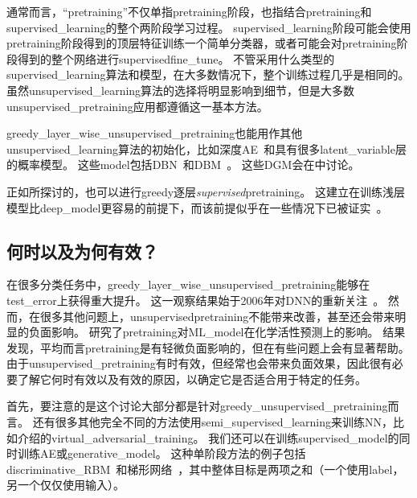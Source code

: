 通常而言，``\gls{pretraining}''不仅单指\gls{pretraining}阶段，也指结合\gls{pretraining}和\gls{supervised_learning}的整个两阶段学习过程。
\gls{supervised_learning}阶段可能会使用\gls{pretraining}阶段得到的顶层特征训练一个简单分类器，或者可能会对\gls{pretraining}阶段得到的整个网络进行\gls{supervised}\gls{fine_tune}。
不管采用什么类型的\gls{supervised_learning}算法和模型，在大多数情况下，整个训练过程几乎是相同的。
虽然\gls{unsupervised_learning}算法的选择将明显影响到细节，但是大多数\gls{unsupervised_pretraining}应用都遵循这一基本方法。


\gls{greedy_layer_wise_unsupervised_pretraining}也能用作其他\gls{unsupervised_learning}算法的初始化，比如深度\gls{AE}~\citep{Hinton-Science2006}和具有很多\gls{latent_variable}层的概率模型。
这些\gls{model}包括\gls{DBN}~\citep{Hinton06-small}和\gls{DBM}~\citep{Salakhutdinov+Hinton-2009-small}。
这些\gls{DGM}会在中讨论。


正如所探讨的，也可以进行\gls{greedy}逐层\emph{\gls{supervised}}\gls{pretraining}。
这建立在训练浅层模型比\gls{deep_model}更容易的前提下，而该前提似乎在一些情况下已被证实~\citep{Erhan+al-2010-small}。

\subsection{何时以及为何有效？}
\label{sec:when_and_why_does_unsupervised_pretraining_work}

在很多分类任务中，\gls{greedy_layer_wise_unsupervised_pretraining}能够在\gls{test_error}上获得重大提升。
这一观察结果始于2006年对\gls{DNN}的重新关注~\citep{Hinton06-small,Bengio-nips-2006,ranzato-07-small}。
然而，在很多其他问题上，\gls{unsupervised}\gls{pretraining}不能带来改善，甚至还会带来明显的负面影响。
\cite{Ma-et-al-2015}研究了\gls{pretraining}对\gls{ML_model}在化学活性预测上的影响。
结果发现，平均而言\gls{pretraining}是有轻微负面影响的，但在有些问题上会有显著帮助。
由于\gls{unsupervised_pretraining}有时有效，但经常也会带来负面效果，因此很有必要了解它何时有效以及有效的原因，以确定它是否适合用于特定的任务。


首先，要注意的是这个讨论大部分都是针对\gls{greedy_unsupervised_pretraining}而言。
还有很多其他完全不同的方法使用\gls{semi_supervised_learning}来训练\gls{NN}，比如介绍的\gls{virtual_adversarial_training}。
我们还可以在训练\gls{supervised_model}的同时训练\gls{AE}或\gls{generative_model}。
这种单阶段方法的例子包括\gls{discriminative_RBM}~\citep{Larochelle+Bengio-2008}和梯形网络~\citep{Rasmus-et-al-arxiv2015}，其中整体目标是两项之和（一个使用\gls{label}，另一个仅仅使用输入）。



